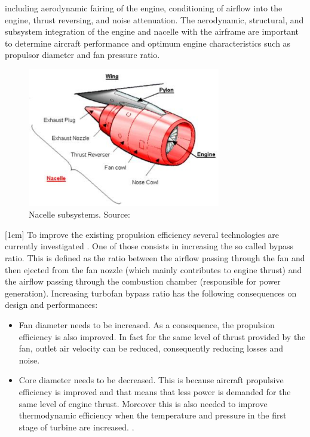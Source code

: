 including aerodynamic fairing of the engine, conditioning of airflow into the engine, thrust reversing, and noise
attenuation. The aerodynamic, structural, and subsystem integration of the engine and nacelle with the airframe are
important to determine aircraft performance and optimum engine characteristics such as propulsor diameter and
fan pressure ratio. \clearpage
\begin{figure}[!ht]
	\centering   
	\includegraphics[width=0.75\textwidth]{images/intro/nacelle}
	\caption{Nacelle subsystems. Source: \cite{ASDM}} 
	\label{fig.intro7}
\end{figure}
[1cm]
To improve the existing propulsion efficiency several technologies are currently investigated \cite{national2016commercial}. One of those consists in increasing the so called bypass ratio. This is defined as the ratio between the airflow passing through the fan and then ejected from the fan nozzle (which mainly contributes to engine thrust) and the airflow passing through the combustion chamber (responsible for power generation).   
Increasing turbofan bypass ratio has the following consequences on design and performances:
\begin{itemize}
\item Fan diameter needs to be increased. As a consequence, the propulsion efficiency is also improved. In fact for the same level of thrust provided by the fan, outlet air velocity  can be reduced, consequently reducing losses and noise. 
\item Core diameter needs to be decreased. This is because aircraft propulsive efficiency is improved and that means that less power is demanded for the same level of engine thrust. Moreover this is also needed to improve thermodynamic efficiency when the temperature and pressure in the first stage of turbine are increased. \cite{national2016commercial}. 
\end{itemize}
